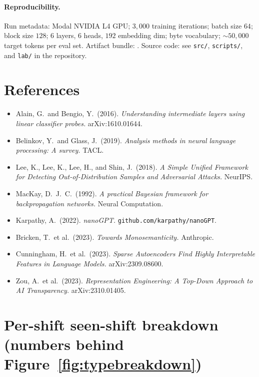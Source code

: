 \documentclass[11pt]{article}
\begin{document}
\paragraph{Reproducibility.}
{\sloppy
Run metadata: Modal NVIDIA L4 GPU; $3{,}000$ training iterations; batch size $64$; block size $128$; $6$ layers, $6$ heads, $192$ embedding dim; byte vocabulary; $\sim 50{,}000$ target tokens per eval set. Artifact bundle: . Source code: see \texttt{src/}, \texttt{scripts/}, and \texttt{lab/} in the repository.\par}

\section*{References}

\begin{itemize}[leftmargin=*,topsep=2pt,itemsep=2pt]
  \item Alain, G.\ and Bengio, Y.\ (2016). \emph{Understanding intermediate layers using linear classifier probes.} arXiv:1610.01644.
  \item Belinkov, Y.\ and Glass, J.\ (2019). \emph{Analysis methods in neural language processing: A survey.} TACL.
  \item Lee, K., Lee, K., Lee, H., and Shin, J.\ (2018). \emph{A Simple Unified Framework for Detecting Out-of-Distribution Samples and Adversarial Attacks.} NeurIPS.
  \item MacKay, D.\ J.\ C.\ (1992). \emph{A practical Bayesian framework for backpropagation networks.} Neural Computation.
  \item Karpathy, A.\ (2022). \emph{nanoGPT.} \texttt{github.com/karpathy/nanoGPT}.
  \item Bricken, T.\ et al.\ (2023). \emph{Towards Monosemanticity.} Anthropic.
  \item Cunningham, H.\ et al.\ (2023). \emph{Sparse Autoencoders Find Highly Interpretable Features in Language Models.} arXiv:2309.08600.
  \item Zou, A.\ et al.\ (2023). \emph{Representation Engineering: A Top-Down Approach to AI Transparency.} arXiv:2310.01405.
\end{itemize}

\clearpage
\appendix

\section{Per-shift seen-shift breakdown (numbers behind Figure~\ref{fig:typebreakdown})}\label{app:typebreakdown}
\end{document}
